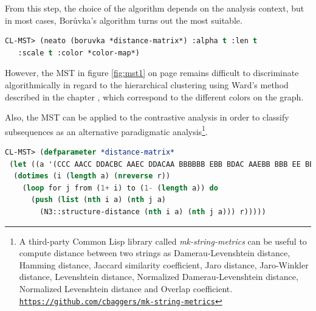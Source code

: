 \smallskip

From this step, the choice of the algorithm depends on the analysis context, but in most cases, Bor\r{u}vka's algorithm turns out the most suitable.

\smallskip

\begin{lstlisting}[language=Lisp]
CL-MST> (neato (boruvka *distance-matrix*) :alpha t :len t 
   :scale t :color *color-map*)
\end{lstlisting}

\smallskip

However, the MST in figure \ref{fig:mst1} on page \pageref{fig:mst1} remains difficult to discriminate algorithmically in regard to the hierarchical clustering using Ward's method described in the chapter \textsl{}, which correspond to the different colors on the graph. 

\bigskip

Also, the MST can be applied to the contrastive analysis in order to classify subsequences as an alternative paradigmatic analysis\footnote{A third-party Common Lisp library called \textsl{mk-string-metrics} can be useful to compute distance between two strings as Damerau-Levenshtein distance, Hamming distance, Jaccard similarity coefficient, Jaro distance, Jaro-Winkler distance, Levenshtein distance, Normalized Damerau-Levenshtein distance, Normalized Levenshtein distance and Overlap coefficient.\\ \indent \href{https://github.com/cbaggers/mk-string-metrics}{\texttt{\scriptsize https://github.com/cbaggers/mk-string-metrics}}}.

\smallskip

\begin{lstlisting}[language=Lisp]
CL-MST> (defparameter *distance-matrix*
 (let ((a '(CCC AACC DDACBC AAEC DDACAA BBBBBB EBB BDAC AAEBB BBB EE BBBBACDEAAEAA CBB BBEAA AABBAD ABCC ACEC DDACDBAE CDAA ABBEAAEBAD AE DEAA EAD DC CBE ABBC EBD ABDAA EBAA ABBEAABC DBB)) r)
  (dotimes (i (length a) (nreverse r))
    (loop for j from (1+ i) to (1- (length a)) do
      (push (list (nth i a) (nth j a)
        (N3::structure-distance (nth i a) (nth j a))) r)))))
\end{lstlisting}

